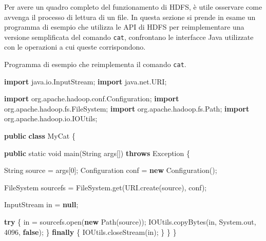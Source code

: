 \documentclass[italian,a4paper, twoside, 12pt]{report}
\newenvironment{Shaded}{}{}
\newcommand{\KeywordTok}[1]{\textcolor[rgb]{0.00,0.44,0.13}{\textbf{#1}}}
\newcommand{\DataTypeTok}[1]{\textcolor[rgb]{0.56,0.13,0.00}{#1}}
\newcommand{\DecValTok}[1]{\textcolor[rgb]{0.25,0.63,0.44}{#1}}
\newcommand{\ImportTok}[1]{#1}
\newcommand{\FunctionTok}[1]{\textcolor[rgb]{0.02,0.16,0.49}{#1}}
\newcommand{\BuiltInTok}[1]{#1}
\newcommand{\NormalTok}[1]{#1}
\begin{document}
Per avere un quadro completo del funzionamento di HDFS, è utile
osservare come avvenga il processo di lettura di un file. In questa
sezione si prende in esame un programma di esempio che utilizza le API
di HDFS per reimplementare una versione semplificata del comando
\texttt{cat}, confrontano le interfacce Java utilizzate con le
operazioni a cui queste corrispondono.

\begin{codelisting}

\caption{Programma di esempio che reimplementa il comando \texttt{cat}.}

\hypertarget{lst:hdfs-cat}{\label{lst:hdfs-cat}}
\begin{Shaded}
\begin{Highlighting}[numbers=left,,]
\KeywordTok{import}\ImportTok{ java.io.InputStream;}
\KeywordTok{import}\ImportTok{ java.net.URI;}

\KeywordTok{import}\ImportTok{ org.apache.hadoop.conf.Configuration;}
\KeywordTok{import}\ImportTok{ org.apache.hadoop.fs.FileSystem;}
\KeywordTok{import}\ImportTok{ org.apache.hadoop.fs.Path;}
\KeywordTok{import}\ImportTok{ org.apache.hadoop.io.IOUtils;}

\KeywordTok{public} \KeywordTok{class}\NormalTok{ MyCat \{}

    \KeywordTok{public} \DataTypeTok{static} \DataTypeTok{void} \FunctionTok{main}\NormalTok{(}\BuiltInTok{String}\NormalTok{ args[]) }\KeywordTok{throws} \BuiltInTok{Exception}\NormalTok{ \{}

        \BuiltInTok{String}\NormalTok{ source = args[}\DecValTok{0}\NormalTok{];}
        \BuiltInTok{Configuration}\NormalTok{ conf = }\KeywordTok{new} \BuiltInTok{Configuration}\NormalTok{();}

\NormalTok{        FileSystem sourcefs = FileSystem.}\FunctionTok{get}\NormalTok{(}\BuiltInTok{URI}\NormalTok{.}\FunctionTok{create}\NormalTok{(source), conf);}

        \BuiltInTok{InputStream}\NormalTok{ in = }\KeywordTok{null}\NormalTok{;}

        \KeywordTok{try}\NormalTok{ \{}
\NormalTok{            in = sourcefs.}\FunctionTok{open}\NormalTok{(}\KeywordTok{new} \FunctionTok{Path}\NormalTok{(source));}
\NormalTok{            IOUtils.}\FunctionTok{copyBytes}\NormalTok{(in, }\BuiltInTok{System}\NormalTok{.}\FunctionTok{out}\NormalTok{, }\DecValTok{4096}\NormalTok{, }\KeywordTok{false}\NormalTok{);}
\NormalTok{        \} }\KeywordTok{finally}\NormalTok{ \{}
\NormalTok{            IOUtils.}\FunctionTok{closeStream}\NormalTok{(in);}
\NormalTok{        \}}
\NormalTok{    \}}
\NormalTok{\}}
\end{Highlighting}
\end{Shaded}

\end{codelisting}
\end{document}
